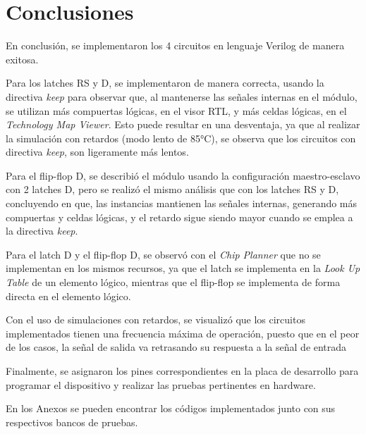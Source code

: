 \section{Conclusiones}
En conclusión, se implementaron los 4 circuitos en lenguaje Verilog de manera exitosa.

Para los latches RS y D, se implementaron de manera correcta, usando la directiva \textit{keep} para observar que, al mantenerse las señales internas en el módulo, se utilizan más compuertas lógicas, en el visor RTL, y más celdas lógicas, en el \textit{Technology Map Viewer}. Esto puede resultar en una desventaja, ya que al realizar la simulación con retardos (modo lento de 85°C), se observa que los circuitos con directiva \textit{keep}, son ligeramente más lentos.

Para el flip-flop D, se describió el módulo usando la configuración maestro-esclavo con 2 latches D, pero se realizó el mismo análisis que con los latches RS y D, concluyendo en que, las instancias mantienen las señales internas, generando más compuertas y celdas lógicas, y el retardo sigue siendo mayor cuando se emplea a la directiva \textit{keep}.

Para el latch D y el flip-flop D, se observó con el \textit{Chip Planner} que no se implementan en los mismos recursos, ya que el latch se implementa en la \textit{Look Up Table} de un elemento lógico, mientras que el flip-flop se implementa de forma directa en el elemento lógico. 

Con el uso de simulaciones con retardos, se visualizó que los circuitos implementados tienen una frecuencia máxima de operación, puesto que en el peor de los casos, la señal de salida va retrasando su respuesta a la señal de entrada

Finalmente, se asignaron los pines correspondientes en la placa de desarrollo para programar el dispositivo y realizar las pruebas pertinentes en hardware.

En los Anexos se pueden encontrar los códigos implementados junto con sus respectivos bancos de pruebas.